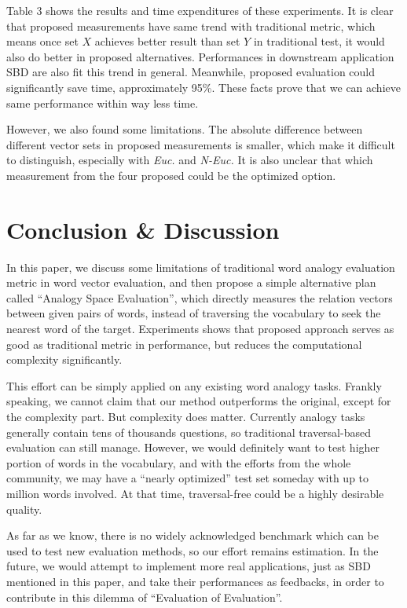 \documentclass[11pt,letterpaper]{article}
\begin{document}
Table 3 shows the results and time expenditures of these experiments. It is clear that proposed measurements have same trend with traditional metric, which means once set $X$ achieves better result than set $Y$ in traditional test, it would also do better in proposed alternatives. Performances in downstream application SBD are also fit this trend in general. Meanwhile, proposed evaluation could significantly save time, approximately 95\%. These facts prove that we can achieve same performance within way less time.

However, we also found some limitations. The absolute difference between different vector sets in proposed measurements is smaller, which make it difficult to distinguish, especially with \textit{Euc.} and \textit{N-Euc.} It is also unclear that which measurement from the four proposed could be the optimized option.

\section{Conclusion \& Discussion}

In this paper, we discuss some limitations of traditional word analogy evaluation metric in word vector evaluation, and then propose a simple alternative plan called ``Analogy Space Evaluation'', which directly measures the relation vectors between given pairs of words, instead of traversing the vocabulary to seek the nearest word of the target. Experiments shows that proposed approach serves as good as traditional metric in performance, but reduces the computational complexity significantly. 

This effort can be simply applied on any existing word analogy tasks. Frankly speaking, we cannot claim that our method outperforms the original, except for the complexity part. But complexity does matter. Currently analogy tasks generally contain tens of thousands questions, so traditional traversal-based evaluation can still manage. However, we would definitely want to test higher portion of words in the vocabulary, and with the efforts from the whole community, we may have a ``nearly optimized'' test set someday with up to million words involved. At that time, traversal-free could be a highly desirable quality.

As far as we know, there is no widely acknowledged benchmark which can be used to test new evaluation methods, so our effort remains estimation. In the future, we would attempt to implement more real applications, just as SBD mentioned in this paper, and take their performances as feedbacks, in order to contribute in this dilemma of ``Evaluation of Evaluation''.



\end{document}
